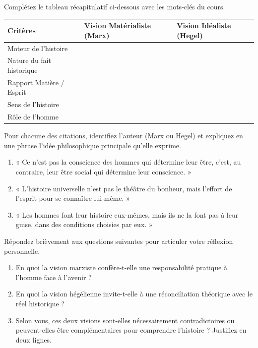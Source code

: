 \documentclass[11pt]{article}
\begin{document}
\begin{exercice}
Complétez le tableau récapitulatif ci-dessous avec les mots-clés du cours.
\begin{center}
\begin{tabular}{|p{3.5cm}|p{5.5cm}|p{5.5cm}|}
\hline
\textbf{Critères} & \textbf{Vision Matérialiste (Marx)} & \textbf{Vision Idéaliste (Hegel)} \\
\hline
Moteur de l'histoire &  &  \\
\hline
Nature du fait historique &  &  \\
\hline
Rapport Matière / Esprit &  &  \\
\hline
Sens de l'histoire &  &  \\
\hline
Rôle de l'homme &  &  \\
\hline
\end{tabular}
\end{center}
\end{exercice}

\begin{exercice}
Pour chacune des citations, identifiez l'auteur (Marx ou Hegel) et expliquez en une phrase l'idée philosophique principale qu'elle exprime.
\begin{enumerate}
    \item « Ce n'est pas la conscience des hommes qui détermine leur être, c'est, au contraire, leur être social qui détermine leur conscience. »
    \item « L'histoire universelle n'est pas le théâtre du bonheur, mais l'effort de l'esprit pour se connaître lui-même. »
    \item « Les hommes font leur histoire eux-mêmes, mais ils ne la font pas à leur guise, dans des conditions choisies par eux. »
\end{enumerate}
\end{exercice}

\begin{exercice}
Répondez brièvement aux questions suivantes pour articuler votre réflexion personnelle.
\begin{enumerate}
    \item En quoi la vision marxiste confère-t-elle une responsabilité pratique à l'homme face à l'avenir ?
    \item En quoi la vision hégélienne invite-t-elle à une réconciliation théorique avec le réel historique ?
    \item Selon vous, ces deux visions sont-elles nécessairement contradictoires ou peuvent-elles être complémentaires pour comprendre l'histoire ? Justifiez en deux lignes.
\end{enumerate}
\end{exercice}
\end{document}
